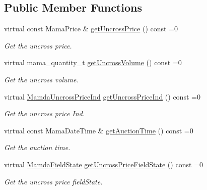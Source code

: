 \subsection*{Public Member Functions}
\begin{CompactItemize}
\item 
virtual const Mama\-Price \& \hyperlink{classWombat_1_1MamdaAuctionUpdate_d0378c46ec803a598951b75dd244e57e}{get\-Uncross\-Price} () const =0
\begin{CompactList}\small\item\em Get the uncross price. \item\end{CompactList}\item 
virtual mama\_\-quantity\_\-t \hyperlink{classWombat_1_1MamdaAuctionUpdate_ddbe2b11a4b8b8465d05468ef0b67b37}{get\-Uncross\-Volume} () const =0
\begin{CompactList}\small\item\em Get the uncross volume. \item\end{CompactList}\item 
virtual \hyperlink{namespaceWombat_4f0ec767cbe150ee160f65e719e76226}{Mamda\-Uncross\-Price\-Ind} \hyperlink{classWombat_1_1MamdaAuctionUpdate_56cc041bff28b5acc670e9c163a9bd9c}{get\-Uncross\-Price\-Ind} () const =0
\begin{CompactList}\small\item\em Get the uncross price Ind. \item\end{CompactList}\item 
virtual const Mama\-Date\-Time \& \hyperlink{classWombat_1_1MamdaAuctionUpdate_2c9cf36bfb31b64dbea181acea7e34b7}{get\-Auction\-Time} () const =0
\begin{CompactList}\small\item\em Get the auction time. \item\end{CompactList}\item 
virtual \hyperlink{namespaceWombat_93aac974f2ab713554fd12a1fa3b7d2a}{Mamda\-Field\-State} \hyperlink{classWombat_1_1MamdaAuctionUpdate_19ed1cff3705e0f124c4a6895ad4a43d}{get\-Uncross\-Price\-Field\-State} () const =0
\begin{CompactList}\small\item\em Get the uncross price field\-State. \item\end{CompactList}\item 

\end{CompactItemize}
